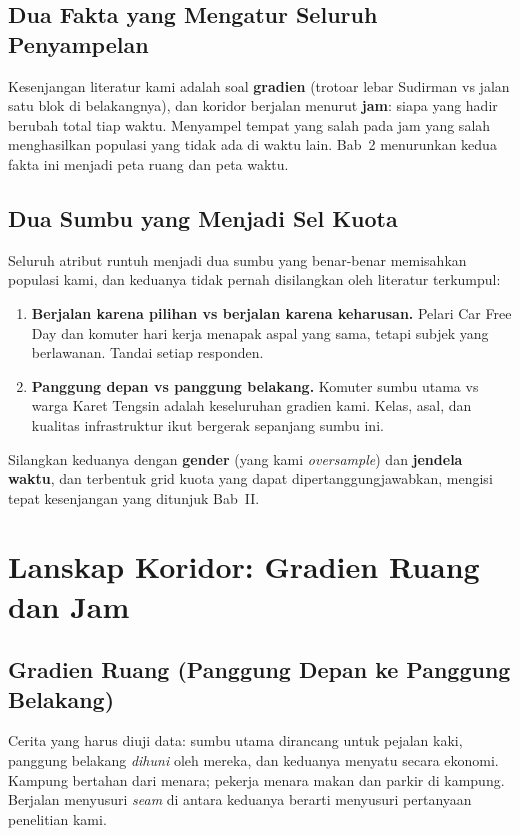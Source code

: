 \documentclass[11pt,a4paper]{report}
\begin{document}
\section{Dua Fakta yang Mengatur Seluruh Penyampelan}
Kesenjangan literatur kami adalah soal \textbf{gradien} (trotoar lebar Sudirman vs
jalan satu blok di belakangnya), dan koridor berjalan menurut \textbf{jam}: siapa
yang hadir berubah total tiap waktu. Menyampel tempat yang salah pada jam yang salah
menghasilkan populasi yang tidak ada di waktu lain. Bab~2 menurunkan kedua fakta ini
menjadi peta ruang dan peta waktu.

\section{Dua Sumbu yang Menjadi Sel Kuota}
Seluruh atribut runtuh menjadi dua sumbu yang benar-benar memisahkan populasi kami,
dan keduanya tidak pernah disilangkan oleh literatur terkumpul:
\begin{enumerate}
  \item \textbf{Berjalan karena pilihan vs berjalan karena keharusan.} Pelari Car
    Free Day dan komuter hari kerja menapak aspal yang sama, tetapi subjek yang
    berlawanan. Tandai setiap responden.
  \item \textbf{Panggung depan vs panggung belakang.} Komuter sumbu utama vs warga
    Karet Tengsin adalah keseluruhan gradien kami. Kelas, asal, dan kualitas
    infrastruktur ikut bergerak sepanjang sumbu ini.
\end{enumerate}
Silangkan keduanya dengan \textbf{gender} (yang kami \emph{oversample}) dan
\textbf{jendela waktu}, dan terbentuk grid kuota yang dapat dipertanggungjawabkan,
mengisi tepat kesenjangan yang ditunjuk Bab~II.

\chapter{Lanskap Koridor: Gradien Ruang dan Jam}

\section{Gradien Ruang (Panggung Depan ke Panggung Belakang)}
Cerita yang harus diuji data: sumbu utama dirancang untuk pejalan kaki, panggung
belakang \emph{dihuni} oleh mereka, dan keduanya menyatu secara ekonomi. Kampung
bertahan dari menara; pekerja menara makan dan parkir di kampung. Berjalan menyusuri
\emph{seam} di antara keduanya berarti menyusuri pertanyaan penelitian kami.
\end{document}
